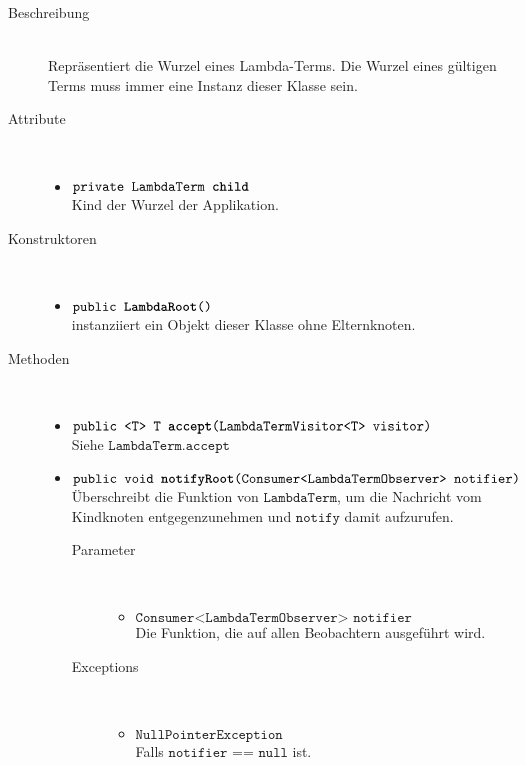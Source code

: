 \begin{description}
\item[Beschreibung] \hfill \\ Repräsentiert die Wurzel eines Lambda-Terms. Die Wurzel eines gültigen Terms muss immer eine Instanz dieser Klasse sein.

\item[Attribute] \hfill \\
	\vspace{-.8cm}
	\begin{itemize}
		\item $\texttt{private LambdaTerm \textbf{child}}$ \\ Kind der Wurzel der Applikation.
	\end{itemize}
	
\item[Konstruktoren] \hfill \\
	\vspace{-.8cm}
	\begin{itemize}
		\item $\texttt{public \textbf{LambdaRoot}()}$ \\ instanziiert ein Objekt dieser Klasse ohne Elternknoten.
	\end{itemize}
	
\item[Methoden] \hfill \\
	\vspace{-.8cm}
	\begin{itemize}
		\item $\texttt{public <T> T \textbf{accept}(LambdaTermVisitor<T> visitor)}$ \\ Siehe $\texttt{LambdaTerm.accept}$
		
		\item $\texttt{public void \textbf{notifyRoot}(Consumer<LambdaTermObserver> notifier)}$ \\ Überschreibt die Funktion von $\texttt{LambdaTerm}$, um die Nachricht vom Kindknoten entgegenzunehmen und $\texttt{notify}$ damit aufzurufen.
		\begin{description}
			\item[Parameter] \hfill \\
			\vspace{-.8cm}
			\begin{itemize}
				\item $\texttt{Consumer<LambdaTermObserver> notifier}$ \\ Die Funktion, die auf allen Beobachtern ausgeführt wird.
			\end{itemize}
			\item[Exceptions] \hfill \\
			\vspace{-.8cm}
			\begin{itemize}
				\item $\texttt{NullPointerException}$ \\ Falls $\texttt{notifier == null}$ ist.
			\end{itemize}
		\end{description}
		

\end{itemize}
\end{description}
